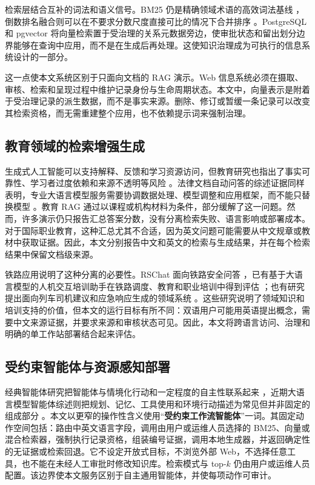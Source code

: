 检索层结合互补的词法和语义信号。BM25 仍是精确领域术语的高效词法基线 \citep{robertson2009bm25}，倒数排名融合则可以在不要求分数尺度直接可比的情况下合并排序 \citep{cormack2009rrf}。PostgreSQL 和 pgvector 将向量检索置于受治理的关系元数据旁边，使审批状态和留出划分边界能够在查询中应用，而不是在生成后再处理。这使知识治理成为可执行的信息系统设计的一部分。

这一点使本文系统区别于只面向文档的 RAG 演示。Web 信息系统必须在摄取、审核、检索和呈现过程中维护记录身份与生命周期状态。本文中，向量表示是附着于受治理记录的派生数据，而不是事实来源。删除、修订或暂缓一条记录可以改变其检索资格，而无需重建整个应用，也不依赖提示词来强制治理。

\subsection{教育领域的检索增强生成}

生成式人工智能可以支持解释、反馈和学习资源访问，但教育研究也指出了事实可靠性、学习者过度依赖和来源不透明等风险 \citep{kasneci2023chatgpt,unesco2023guidance}。法律文档自动问答的综述证据同样表明，专业大语言模型服务需要协调数据处理、模型调整和应用框架，而不能只替换模型 \citep{yang2024legalqa}。教育 RAG 通过以课程或机构材料为条件，部分缓解了这一问题。然而，许多演示仍只报告汇总答案分数，没有分离检索失败、语言影响或部署成本。对于国际职业教育，这种汇总尤其不合适，因为英文问题可能需要从中文规章或教材中获取证据。因此，本文分别报告中文和英文的检索与生成结果，并在每个检索结果中保留文档级来源。

铁路应用说明了这种分离的必要性。RSChat 面向铁路安全问答 \citep{li2024rschat}，已有基于大语言模型的人机交互培训助手在铁路调度、教育和职业培训中得到评估 \citep{li2025training}；也有研究提出面向列车司机建议和应急响应生成的领域系统 \citep{luo2025driver,huang2026emergency}。这些研究说明了领域知识和培训支持的价值，但本文的运行目标有所不同：双语用户可能用英语提出概念，需要中文来源证据，并要求来源和审核状态可见。因此，本文将跨语言访问、治理和明确的单工作站部署结合起来评估。

\subsection{受约束智能体与资源感知部署}

经典智能体研究把智能体与情境化行动和一定程度的自主性联系起来 \citep{wooldridge1995agents}，近期大语言模型智能体综述则把规划、记忆、工具使用和环境行动描述为常见但并非固定的组成部分 \citep{xi2025agents}。本文以更窄的操作性含义使用“\textbf{受约束工作流智能体}”一词。其固定动作空间包括：路由中英文语言字段，调用由用户或运维人员选择的 BM25、向量或混合检索器，强制执行记录资格，组装编号证据，调用本地生成器，并返回确定性的无证据或检索回退。它不设定开放式目标，不浏览外部 Web，不选择任意工具，也不能在未经人工审批时修改知识库。检索模式与 top-$k$ 仍由用户或运维人员配置。该边界使本文服务区别于自主通用智能体，并使每项动作可审计。

